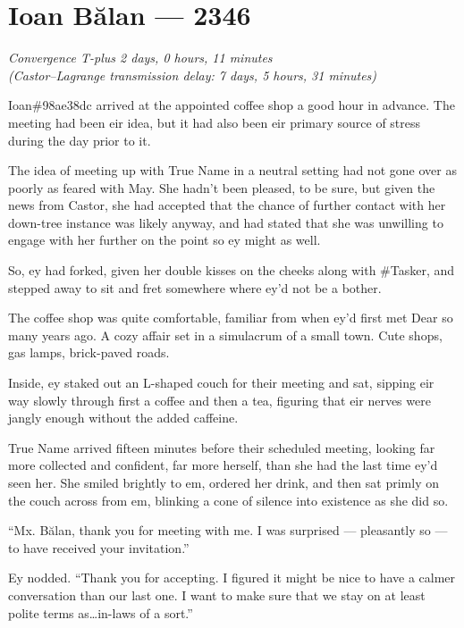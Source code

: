 \hypertarget{ioan-bux103lan-2346}{%
\chapter{Ioan Bălan — 2346}\label{ioan-bux103lan-2346}}

\begin{center}
\emph{Convergence T-plus 2 days, 0 hours, 11 minutes}\\
\emph{(Castor--Lagrange transmission delay: 7 days, 5 hours, 31 minutes)}
\end{center}

\noindent Ioan\#98ae38dc arrived at the appointed coffee shop a good hour in advance. The meeting had been eir idea, but it had also been eir primary source of stress during the day prior to it.

The idea of meeting up with True Name in a neutral setting had not gone over as poorly as feared with May. She hadn't been pleased, to be sure, but given the news from Castor, she had accepted that the chance of further contact with her down-tree instance was likely anyway, and had stated that she was unwilling to engage with her further on the point so ey might as well.

So, ey had forked, given her double kisses on the cheeks along with \#Tasker, and stepped away to sit and fret somewhere where ey'd not be a bother.

The coffee shop was quite comfortable, familiar from when ey'd first met Dear so many years ago. A cozy affair set in a simulacrum of a small town. Cute shops, gas lamps, brick-paved roads.

Inside, ey staked out an L-shaped couch for their meeting and sat, sipping eir way slowly through first a coffee and then a tea, figuring that eir nerves were jangly enough without the added caffeine.

True Name arrived fifteen minutes before their scheduled meeting, looking far more collected and confident, far more herself, than she had the last time ey'd seen her. She smiled brightly to em, ordered her drink, and then sat primly on the couch across from em, blinking a cone of silence into existence as she did so.

``Mx. Bălan, thank you for meeting with me. I was surprised — pleasantly so — to have received your invitation.''

Ey nodded. ``Thank you for accepting. I figured it might be nice to have a calmer conversation than our last one. I want to make sure that we stay on at least polite terms as\ldots in-laws of a sort.''

